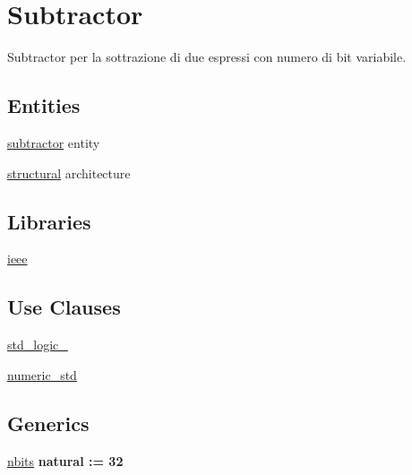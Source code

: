 \hypertarget{group___subtractor}{}\section{Subtractor}
\label{group___subtractor}


Subtractor per la sottrazione di due espressi con numero di bit variabile.  


\subsection*{Entities}
\begin{DoxyCompactItemize}
\item 
\hyperlink{classsubtractor}{subtractor} entity
\item 
\hyperlink{classsubtractor_1_1structural}{structural} architecture
\end{DoxyCompactItemize}
\subsection*{Libraries}
 \begin{DoxyCompactItemize}
\item 
\hyperlink{group___subtractor_ga0a6af6eef40212dbaf130d57ce711256}{ieee} 
\end{DoxyCompactItemize}
\subsection*{Use Clauses}
 \begin{DoxyCompactItemize}
\item 
\hyperlink{group___subtractor_gacd03516902501cd1c7296a98e22c6fcb}{std\+\_\+logic\+\_}   
\item 
\hyperlink{group___subtractor_ga2edc34402b573437d5f25fa90ba4013e}{numeric\+\_\+std}   
\end{DoxyCompactItemize}
\subsection*{Generics}
 \begin{DoxyCompactItemize}
\item 
\hyperlink{group___subtractor_gae1435c07d0cd54b521535e2f8de6f94e}{nbits} {\bfseries {\bfseries \textcolor{vhdlchar}{natural}\textcolor{vhdlchar}{ }\textcolor{vhdlchar}{ }\textcolor{vhdlchar}{\+:}\textcolor{vhdlchar}{=}\textcolor{vhdlchar}{ }\textcolor{vhdlchar}{ } \textcolor{vhdldigit}{32} \textcolor{vhdlchar}{ }}}
\end{DoxyCompactItemize}
